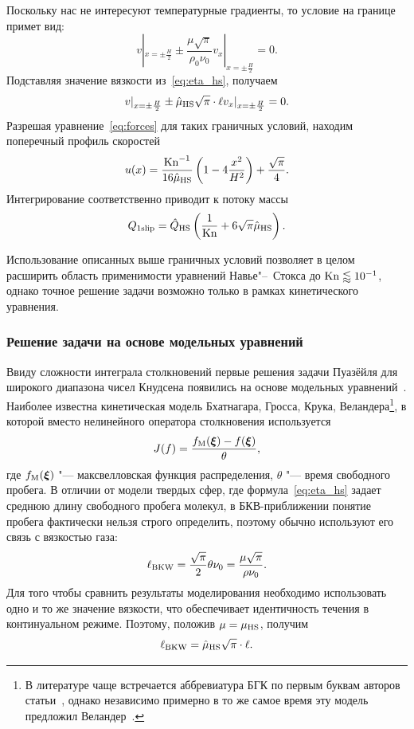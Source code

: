 Поскольку нас не интересуют температурные градиенты, то условие на границе примет вид:
\[ v|_{x=\pm\frac{H}{2}} \pm \frac{\mu\sqrt{\pi}}{\rho_0\nu_0}v_x|_{x=\pm\frac{H}{2}} = 0. \]
Подставляя значение вязкости из~\eqref{eq:eta_hs}, получаем
\[ v|_{x=\pm\frac{H}{2}} \pm \hat{\mu}_{\rm{HS}}\sqrt{\pi}\cdot\ell v_x|_{x=\pm\frac{H}{2}} = 0. \]
Разрешая уравнение~\eqref{eq:forces} для таких граничных условий, находим поперечный профиль скоростей
\[ u(x) = \frac{\mathrm{Kn}^{-1}}{16\hat{\mu}_{\rm{HS}}} \left(1-4\frac{x^2}{H^2}\right) + \frac{\sqrt{\pi}}{4}. \]
Интегрирование соответственно приводит к потоку массы
\[ Q_{1\text{slip}} = \hat{Q}_{\rm{HS}}\left(\frac1{\mathrm{Kn}} + 6\sqrt{\pi}\hat{\mu}_{\rm{HS}} \right). \]

Использование описанных выше граничных условий позволяет в целом расширить область применимости
уравнений Навье"--~Стокса до \(\mathrm{Kn}\lessapprox10^{-1}\), однако точное решение задачи возможно
только в рамках кинетического уравнения.

\subsubsection{Решение задачи на основе модельных уравнений}

Ввиду сложности интеграла столкновений первые решения задачи Пуазёйля для широкого диапазона чисел Кнудсена
появились на основе модельных уравнений~\cite{Cercignani1963}.
Наиболее известна кинетическая модель Бхатнагара, Гросса, Крука, Веландера\footnote
{
	В литературе чаще встречается аббревиатура БГК по первым буквам авторов статьи~\cite{Bhatnagar1954},
	однако независимо примерно в то же самое время эту модель предложил Веландер~\cite{Welander1954}.
},
в которой вместо нелинейного оператора столкновения используется
\[ J(f) = \frac{f_{\rm{M}}(\boldsymbol\xi) - f(\boldsymbol\xi)}{\theta}, \]
где \(f_{\rm{M}}(\boldsymbol\xi)\) "--- максвелловская функция распределения, \(\theta\) "--- время свободного пробега.
В отличии от модели твердых сфер, где формула~\eqref{eq:eta_hs} задает среднюю длину свободного пробега молекул,
в БКВ-приближении понятие пробега фактически нельзя строго определить,
поэтому обычно используют его связь с вязкостью газа:
\[ \ell_{\rm{BKW}} = \frac{\sqrt{\pi}}{2}\theta\nu_0 = \frac{\mu\sqrt{\pi}}{\rho\nu_0}. \]
Для того чтобы сравнить результаты моделирования необходимо использовать одно и то же значение вязкости,
что обеспечивает идентичность течения в континуальном режиме.
Поэтому, положив \(\mu = \mu_{\rm{HS}}\), получим
\[ \ell_{\rm{BKW}} = \hat{\mu}_{\rm{HS}}\sqrt{\pi}\cdot\ell. \]

